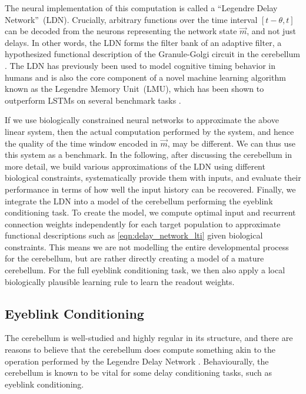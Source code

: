 The neural implementation of this computation is called a \enquote{Legendre Delay Network}~(LDN).
Crucially, arbitrary functions over the time interval $[t - \theta, t]$ can be decoded from the neurons representing the network state $\vec m$, and not just delays. In other words, the LDN forms the filter bank of an adaptive filter, a hypothesized functional description of the Granule-Golgi circuit in the cerebellum \citet{fujita1982adaptive}. The LDN has previously been used to model cognitive timing behavior in humans \citet{jong2019flexible} and is also the core component of a novel machine learning algorithm known as the Legendre Memory Unit~(LMU), which has been shown to outperform LSTMs on several benchmark tasks \citep{voelker2019lmu}.

If we use biologically constrained neural networks to approximate the above linear system, then the actual computation performed by the system, and hence the quality of the time window encoded in $\vec m$, may be different.
We can thus use this system as a benchmark.
In the following, after discussing the cerebellum in more detail, we build various approximations of the LDN using different biological constraints, systematically provide them with inputs, and evaluate their performance in terms of how well the input history can be recovered. Finally, we integrate the LDN into a model of the cerebellum performing the eyeblink conditioning task.
To create the model, we compute optimal input and recurrent connection weights independently for each target population to approximate functional descriptions such as \cref{eqn:delay_network_lti} given biological constraints.
This means we are not modelling the entire developmental process for the cerebellum, but are rather directly creating a model of a mature cerebellum.  For the full eyeblink conditioning task, we then also apply a local biologically plausible learning rule to learn the readout weights.

\subsection{Eyeblink Conditioning}

The cerebellum is well-studied and highly regular in its structure, and there are reasons to believe that the cerebellum does compute something akin to the operation performed by the Legendre Delay Network \citet{fujita1982adaptive}. Behaviourally, the cerebellum is known to be vital for some delay conditioning tasks, such as eyeblink conditioning.

